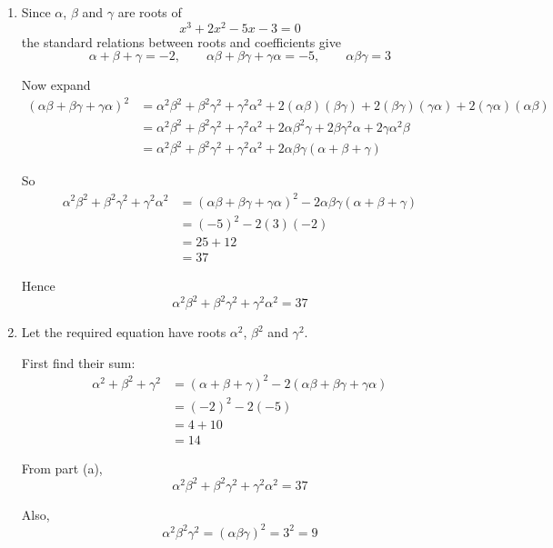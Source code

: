 \documentclass[leqno]{article}
\begin{document}
\begin{enumerate}[
  label=\textbf{\arabic*.},
  leftmargin=*,
  topsep=0pt,
  partopsep=0pt,
  parsep=0pt
]
\vspace*{10pt}

\begin{tcolorbox}[colback=white, colframe=scarlet, title={\textbf{Solution}}, breakable, grow to left by=6mm, grow to right by=10mm]
\begin{enumerate}[label=\textbf{(\alph*)}]
  \item Since $\alpha$, $\beta$ and $\gamma$ are roots of
\[
x^3+2x^2-5x-3=0
\]
the standard relations between roots and coefficients give
\[
\alpha+\beta+\gamma=-2,\qquad \alpha\beta+\beta\gamma+\gamma\alpha=-5,\qquad \alpha\beta\gamma=3
\]

Now expand
\begin{align*}
(\alpha\beta+\beta\gamma+\gamma\alpha)^2
&=\alpha^2\beta^2+\beta^2\gamma^2+\gamma^2\alpha^2
   +2(\alpha\beta)(\beta\gamma)+2(\beta\gamma)(\gamma\alpha)+2(\gamma\alpha)(\alpha\beta)\\
&=\alpha^2\beta^2+\beta^2\gamma^2+\gamma^2\alpha^2
   +2\alpha\beta^2\gamma+2\beta\gamma^2\alpha+2\gamma\alpha^2\beta\\
&=\alpha^2\beta^2+\beta^2\gamma^2+\gamma^2\alpha^2
   +2\alpha\beta\gamma(\alpha+\beta+\gamma)
\end{align*}

So
\begin{align*}
\alpha^2\beta^2+\beta^2\gamma^2+\gamma^2\alpha^2
&=(\alpha\beta+\beta\gamma+\gamma\alpha)^2-2\alpha\beta\gamma(\alpha+\beta+\gamma)\\
&=(-5)^2-2(3)(-2)\\
&=25+12\\
&=37
\end{align*}

Hence
\[
\alpha^2\beta^2+\beta^2\gamma^2+\gamma^2\alpha^2=37
\]

  \item Let the required equation have roots $\alpha^2$, $\beta^2$ and $\gamma^2$.

First find their sum:
\begin{align*}
\alpha^2+\beta^2+\gamma^2
&=(\alpha+\beta+\gamma)^2-2(\alpha\beta+\beta\gamma+\gamma\alpha)\\
&=(-2)^2-2(-5)\\
&=4+10\\
&=14
\end{align*}

From part (a),
\[
\alpha^2\beta^2+\beta^2\gamma^2+\gamma^2\alpha^2=37
\]

Also,
\[
\alpha^2\beta^2\gamma^2=(\alpha\beta\gamma)^2=3^2=9
\]


\end{enumerate}
\end{tcolorbox}
\end{enumerate}
\end{document}
